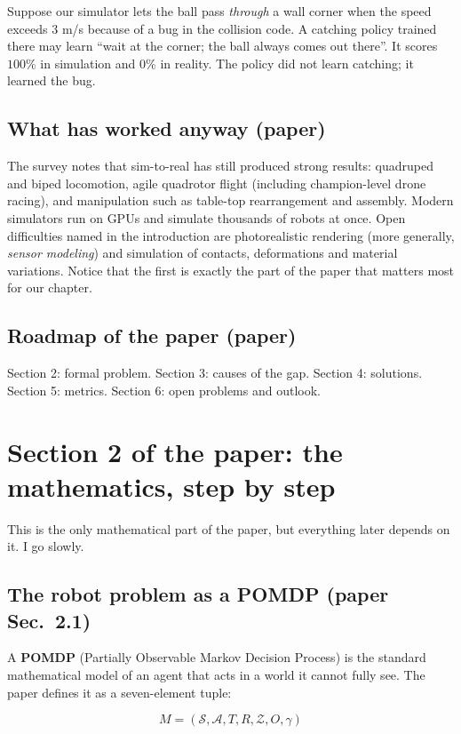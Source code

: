 \documentclass[11pt,a4paper]{article}
\begin{document}
\begin{toy}
Suppose our simulator lets the ball pass \emph{through} a wall corner when the speed exceeds
$3$ m/s because of a bug in the collision code. A catching policy trained there may learn
``wait at the corner; the ball always comes out there''. It scores $100\%$ in simulation and
$0\%$ in reality. The policy did not learn catching; it learned the bug.
\end{toy}

\subsection{What has worked anyway \textnormal{\textbf{(paper)}}}
The survey notes that sim-to-real has still produced strong results: quadruped and biped
locomotion, agile quadrotor flight (including champion-level drone racing), and manipulation such
as table-top rearrangement and assembly. Modern simulators run on GPUs and simulate thousands of
robots at once. Open difficulties named in the introduction are photorealistic rendering (more
generally, \emph{sensor modeling}) and simulation of contacts, deformations and material
variations. Notice that the first is exactly the part of the paper that matters most for our
chapter.

\subsection{Roadmap of the paper \textnormal{\textbf{(paper)}}}
Section 2: formal problem. Section 3: causes of the gap. Section 4: solutions. Section 5:
metrics. Section 6: open problems and outlook.

\section{Section 2 of the paper: the mathematics, step by step}

This is the only mathematical part of the paper, but everything later depends on it. I go slowly.

\subsection{The robot problem as a POMDP \textnormal{(paper Sec.~2.1)}}

A \textbf{POMDP} (Partially Observable Markov Decision Process) is the standard mathematical
model of an agent that acts in a world it cannot fully see. The paper defines it as a
seven-element tuple:
\begin{eqbox}
\[
M=(\mathcal S,\mathcal A,T,R,\mathcal Z,O,\gamma)
\]
\end{eqbox}
\end{document}
